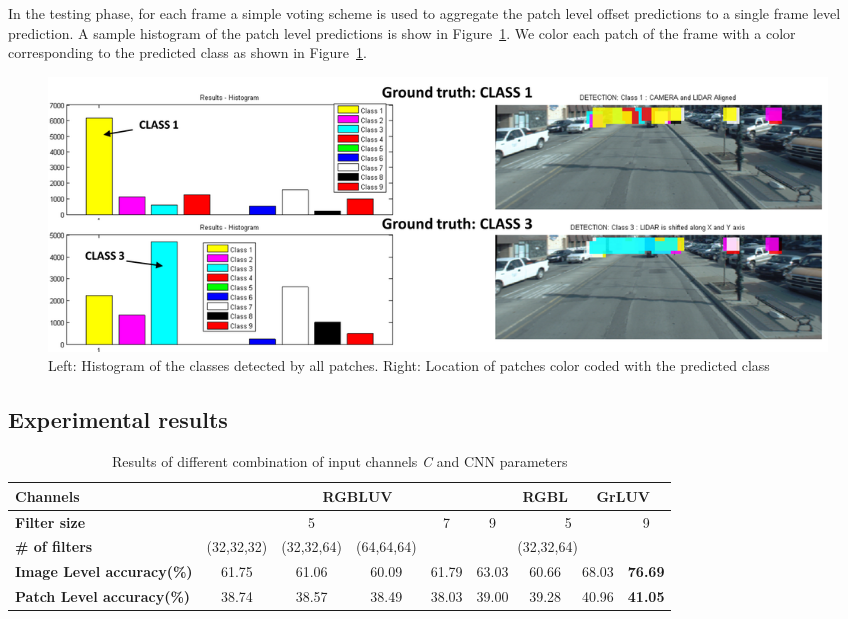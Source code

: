 \documentclass{article}
\begin{document}
In the testing phase, for each frame a simple voting scheme is used to aggregate the patch level offset predictions to a single frame level prediction. A sample histogram of the patch level predictions is show in Figure~\ref{fig:Figures_Voting}. We color each patch of the frame with a color corresponding to the predicted class as shown in Figure~\ref{fig:Figures_Voting}. 

\begin{figure}[htbp]
    \centering
        \includegraphics[scale=0.35]{Figures/Voting_final.png}
    \caption{Left: Histogram of the classes detected by all patches. Right: Location of patches color coded with the predicted class}
    \label{fig:Figures_Voting}
\end{figure}


\subsection{Experimental results} %
\label{sub:experimental_results}

\begin{table}[ht]
\small
\caption{Results of different combination of input channels \emph{C} and CNN parameters}

\begin{center}
\begin{tabular}{|p{2cm}|c|c|c|c|c|c|c|c|} \hline
    \textbf{Channels} & \multicolumn{5}{|c|}{RGBLUV} & RGBL & \multicolumn{2}{|c|}{GrLUV} \\
    \hline
    \textbf{Filter size} &\multicolumn{3}{|c|}{5} & 7 & 9 & \multicolumn{2}{|c|}{5} & 9 \\
    \hline
    \textbf{\# of filters} & (32,32,32) & (32,32,64) & (64,64,64) & \multicolumn{5}{|c|}{(32,32,64)}  \\
    \hline
    \textbf{Image Level accuracy(\%)} & 61.75 & 61.06 & 60.09 & 61.79 & 63.03 & 60.66 & 68.03 & \textbf{76.69} \\
    \hline
    \textbf{Patch Level accuracy(\%)} & 38.74 & 38.57 & 38.49 & 38.03 & 39.00 & 39.28 & 40.96 & \textbf{41.05} \\
    \hline
\end{tabular}
\label{table:cnn_param}
\end{center}
\end{table}
\end{document}
